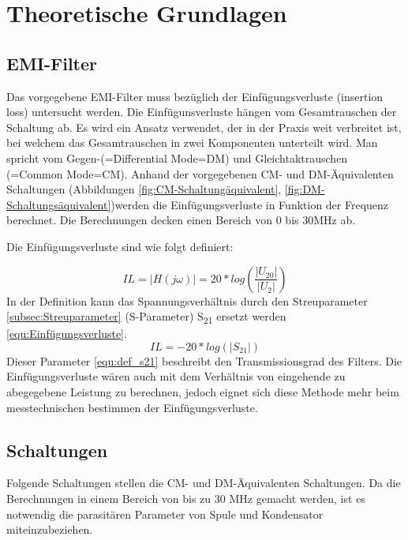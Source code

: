 \section{Theoretische Grundlagen} \label{sec:TheoretischeGrundlagen}

\subsection{EMI-Filter} \label{subsec:emifilter}
Das vorgegebene EMI-Filter muss bezüglich der Einfügungsverluste (insertion loss) untersucht werden. Die Einfügunsverluste hängen vom Gesamtrauschen der Schaltung ab. Es wird ein Ansatz verwendet, der in der Praxis weit verbreitet ist, bei welchem das Gesamtrauschen in zwei Komponenten unterteilt wird. Man spricht vom Gegen-(=Differential Mode=DM) und Gleichtaktrauschen (=Common Mode=CM). Anhand der vorgegebenen CM- und DM-Äquivalenten Schaltungen (Abbildungen \ref{fig:CM-Schaltungäquivalent}, \ref{fig:DM-Schaltungsäquivalent})werden die Einfügungsverluste in Funktion der Frequenz berechnet. Die Berechnungen decken einen Bereich von 0 bis 30MHz ab.

Die Einfügungsverluste sind wie folgt definiert: 

\begin{equation}\label{equ:Freqgang}
	IL = \left\lvert H(j\omega) \right\rvert = 20*log(\frac{ \left\lvert U_{20} \right\rvert }{ \left\lvert U_2 \right\rvert })
\end{equation}
In der Definition kann das Spannungsverhältnis durch den Streuparameter \ref{subsec:Streuparameter} (S-Parameter) S\textsubscript{21} ersetzt werden \ref{equ:Einfügungsverluste}.
\begin{equation}\label{equ:Einfügungsverluste}
	IL = -20*log (\left\lvert S_{21} \right\rvert)
\end{equation}
 Dieser Parameter \ref{equ:def_s21} beschreibt den Transmissionsgrad des Filters. Die Einfügungsverluste wären auch mit dem Verhältnis von eingehende zu abegegebene Leistung zu berechnen, jedoch eignet sich diese Methode mehr beim messtechnischen bestimmen der Einfügungsverluste. 
\newpage
\subsection{Schaltungen} \label{subsec:schaltungen}
Folgende Schaltungen stellen die CM- und DM-Äquivalenten Schaltungen. Da die Berechnungen in einem Bereich von bis zu 30 MHz gemacht werden, ist es notwendig die parasitären Parameter von Spule und Kondensator miteinzubeziehen.

